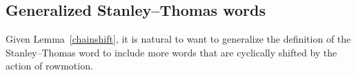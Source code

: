 \documentclass[ALCO,Unicode,published]{cedram}
\numberwithin{equation}{section}
\begin{document}











\subsection{Generalized Stanley--Thomas words}
Given Lemma~\ref{chainshift}, it is natural to want to generalize the definition of the Stanley--Thomas word to include more words that are cyclically shifted by the action of rowmotion. 
\end{document}
